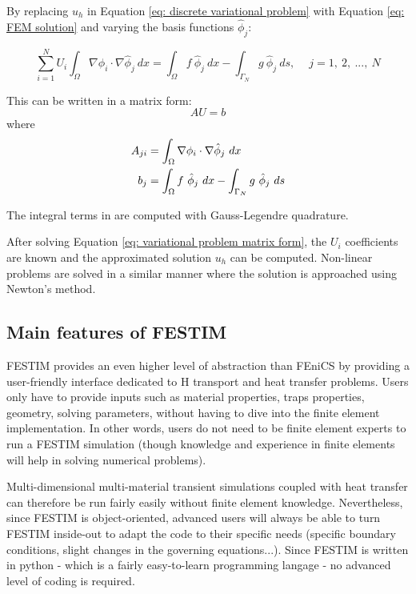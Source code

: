 By replacing $u_h$ in Equation \ref{eq: discrete variational problem} with Equation \ref{eq: FEM solution} and varying the basis functions $\hat{\phi}_j$:

\begin{equation}
    \sum^N_{i=1} U_i \int_\Omega \nabla \phi_i \cdot \nabla \hat{\phi}_j \ dx = \int_\Omega f \ \hat{\phi}_j \ dx - \int_{\Gamma_N} g \ \hat{\phi}_j \ ds , \quad \ j = 1, \ 2, \ ..., \ N
\end{equation}

This can be written in a matrix form:
\begin{equation}
    AU = b
    \label{eq: variational problem matrix form}
\end{equation}
where
\begin{subequations}
    \begin{align}
        A_{ji} &= \int_\Omega \nabla \phi_i \cdot \nabla \hat{\phi}_j \ dx \\
        b_{j} &= \int_\Omega f \ \hat{\phi}_j \ dx - \int_{\Gamma_N} g \ \hat{\phi}_j \ ds
    \end{align}
    \labeq{eq: matrices A and b}
\end{subequations}

The integral terms in  are computed with Gauss-Legendre quadrature.

After solving Equation \ref{eq: variational problem matrix form}, the $U_i$ coefficients are known and the approximated solution $u_h$ can be computed.
Non-linear problems are solved in a similar manner where the solution is approached using Newton's method.

\subsection{Main features of FESTIM}
FESTIM provides an even higher level of abstraction than FEniCS by providing a user-friendly interface dedicated to H transport and heat transfer problems.
Users only have to provide inputs such as material properties, traps properties, geometry, solving parameters, without having to dive into the finite element implementation.
In other words, users do not need to be finite element experts to run a FESTIM simulation (though knowledge and experience in finite elements will help in solving numerical problems).

Multi-dimensional multi-material transient simulations coupled with heat transfer can therefore be run fairly easily without finite element knowledge.
Nevertheless, since FESTIM is object-oriented, advanced users will always be able to turn FESTIM inside-out to adapt the code to their specific needs (specific boundary conditions, slight changes in the governing equations...).
Since FESTIM is written in python - which is a fairly easy-to-learn programming langage - no advanced level of coding is required.

